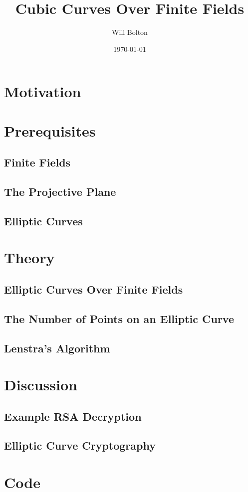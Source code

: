 \documentclass[a4paper,12pt,titlepage,oneside]{article}
\title{Cubic Curves Over Finite Fields}
\author{Will Bolton}
\date{\today}
\begin{document}
\maketitle
\tableofcontents
\clearpage

\section*{Motivation}

\nocite{*}
\clearpage

\section{Prerequisites}
\subsection{Finite Fields}

\subsection{The Projective Plane}

\subsection{Elliptic Curves}

\clearpage

\section{Theory}
\subsection{Elliptic Curves Over Finite Fields}

\subsection{The Number of Points on an Elliptic Curve}

\subsection{Lenstra's Algorithm}

\clearpage

\section{Discussion}
\subsection{Example RSA Decryption}

\subsection{Elliptic Curve Cryptography}

\clearpage

\appendix
\section{Code}


\end{document}
